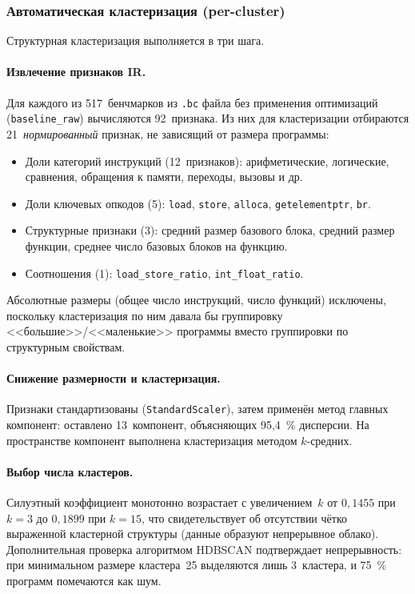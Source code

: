 \subsubsection{Автоматическая кластеризация (per-cluster)}

Структурная кластеризация выполняется в три шага.

\paragraph{Извлечение признаков IR.} Для каждого из 517~бенчмарков из \texttt{.bc} файла без применения оптимизаций (\texttt{baseline\_raw}) вычисляются 92~признака. Из них для кластеризации отбираются 21~\emph{нормированный} признак, не зависящий от размера программы:

\begin{itemize}
    \item Доли категорий инструкций (12~признаков): арифметические, логические, сравнения, обращения к памяти, переходы, вызовы и др.
    \item Доли ключевых опкодов (5): \texttt{load}, \texttt{store}, \texttt{alloca}, \texttt{getelementptr}, \texttt{br}.
    \item Структурные признаки (3): средний размер базового блока, средний размер функции, среднее число базовых блоков на функцию.
    \item Соотношения (1): \texttt{load\_store\_ratio}, \texttt{int\_float\_ratio}.
\end{itemize}

Абсолютные размеры (общее число инструкций, число функций) исключены, поскольку кластеризация по ним давала бы группировку <<большие>>/<<маленькие>> программы вместо группировки по структурным свойствам.

\paragraph{Снижение размерности и кластеризация.} Признаки стандартизованы (\texttt{StandardScaler}), затем применён метод главных компонент: оставлено 13~компонент, объясняющих 95{,}4~\% дисперсии. На пространстве компонент выполнена кластеризация методом $k$-средних.

\paragraph{Выбор числа кластеров.} Силуэтный коэффициент монотонно возрастает с увеличением~$k$ от $0{,}1455$ при $k=3$ до $0{,}1899$ при $k=15$, что свидетельствует об отсутствии чётко выраженной кластерной структуры (данные образуют непрерывное облако). Дополнительная проверка алгоритмом HDBSCAN подтверждает непрерывность: при минимальном размере кластера~25 выделяются лишь 3~кластера, и 75~\% программ помечаются как шум.

